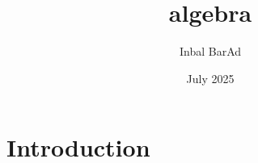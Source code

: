 \documentclass{article}
\title{algebra}
\author{Inbal BarAd}
\date{July 2025}
\begin{document}
\maketitle

\section{Introduction}
\end{document}
